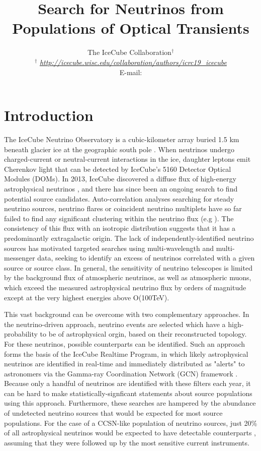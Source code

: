 \documentclass{PoS}
\title{Search for Neutrinos from Populations of Optical Transients}
\author{
The IceCube Collaboration$^{\dagger}$\\
{$^{\dagger}$ \itshape \href{http://icecube.wisc.edu/collaboration/authors/icrc19_icecube}{http://icecube.wisc.edu/collaboration/authors/icrc19\_icecube}}\\
E-mail: \email{robert.stein@desy.de}
}
\begin{document}
	
\section{Introduction}

The IceCube Neutrino Observatory is a cubic-kilometer array buried 1.5 km beneath glacier ice at the geographic south pole \cite{Aartsen:2016nxy}. When neutrinos undergo charged-current  or neutral-current interactions in the ice, daughter leptons emit Cherenkov light that can be detected by IceCube's 5160 Detector Optical Modules (DOMs). In 2013, IceCube discovered a diffuse flux of high-energy astrophysical neutrinos \cite{Aartsen:2013jdh}, and there has since been an ongoing search to find potential source candidates. Auto-correlation analyses searching for steady neutrino sources, neutrino flares or coincident neutrino multiplets have so far failed to find any significant clustering within the neutrino flux (e.g  \cite{Aartsen:2016oji}). The consistency of this flux with an isotropic distribution suggests that it has a predominantly extragalactic origin. The lack of independently-identified neutrino sources has motivated targeted searches using multi-wavelength and multi-messenger data, seeking to identify an excess of neutrinos correlated with a given source or source class. In general, the sensitivity of neutrino telescopes is limited by the background flux of atmospheric neutrinos, as well as atmospheric muons, which exceed the measured astrophysical neutrino flux by orders of magnitude except at the very highest energies above O(100TeV). 

This vast background can be overcome with two complementary approaches. In the neutrino-driven approach, neutrino events are selected which have a high-probability to be of astrophysical orgin, based on their reconstructed topology. For these neutrinos, possible counterparts can be identified. Such an approach forms the basis of the IceCube Realtime Program, in which likely astrophysical neutrinos are identified in real-time and immediately distributed as "alerts" to astronomers via the Gamma-ray Coordination Network (GCN) framework \cite{Aartsen:2016lmt}. Because only a handful of neutrinos are identified with these filters each year, it can be hard to make statistically-signficant statements about source populations using this approach. Furthermore, these searches are hampered by the abundance of undetected neutrino sources that would be expected for most source populations. For the case of a CCSN-like population of neutrino sources, just 20\% of all astrophysical neutrinos would be expected to have detectable counterparts \cite{Kankare:2019bzi}, assuming that they were followed up by the most sensitive current instruments.
\end{document}

